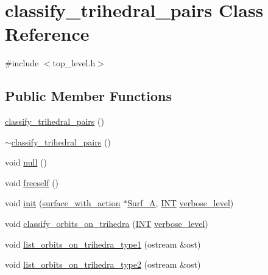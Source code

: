 \hypertarget{classclassify__trihedral__pairs}{}\section{classify\+\_\+trihedral\+\_\+pairs Class Reference}
\label{classclassify__trihedral__pairs}


{\ttfamily \#include $<$top\+\_\+level.\+h$>$}

\subsection*{Public Member Functions}
\begin{DoxyCompactItemize}
\item 
\mbox{\hyperlink{classclassify__trihedral__pairs_a841688b6e1756306ce583b177058911e}{classify\+\_\+trihedral\+\_\+pairs}} ()
\item 
\mbox{\hyperlink{classclassify__trihedral__pairs_a356342a8528414097f3bedbe4bef0212}{$\sim$classify\+\_\+trihedral\+\_\+pairs}} ()
\item 
void \mbox{\hyperlink{classclassify__trihedral__pairs_a53e32015beafedea45f4a695f7f13495}{null}} ()
\item 
void \mbox{\hyperlink{classclassify__trihedral__pairs_a961a7d8228b1ab817d34b3e890186506}{freeself}} ()
\item 
void \mbox{\hyperlink{classclassify__trihedral__pairs_aa71b831292894efc9687cb3e8c8dd73e}{init}} (\mbox{\hyperlink{classsurface__with__action}{surface\+\_\+with\+\_\+action}} $\ast$\mbox{\hyperlink{classclassify__trihedral__pairs_a87a7ed755070199fdf9fad47ae98dcbe}{Surf\+\_\+A}}, \mbox{\hyperlink{galois_8h_a09fddde158a3a20bd2dcadb609de11dc}{I\+NT}} \mbox{\hyperlink{simeon_8_c_a818073fbcc2f439e7c56952f67386122}{verbose\+\_\+level}})
\item 
void \mbox{\hyperlink{classclassify__trihedral__pairs_a99625621bfba4bb65b3d60304b306539}{classify\+\_\+orbits\+\_\+on\+\_\+trihedra}} (\mbox{\hyperlink{galois_8h_a09fddde158a3a20bd2dcadb609de11dc}{I\+NT}} \mbox{\hyperlink{simeon_8_c_a818073fbcc2f439e7c56952f67386122}{verbose\+\_\+level}})
\item 
void \mbox{\hyperlink{classclassify__trihedral__pairs_a5289f00a07639129c5264ba88508ca13}{list\+\_\+orbits\+\_\+on\+\_\+trihedra\+\_\+type1}} (ostream \&ost)
\item 
void \mbox{\hyperlink{classclassify__trihedral__pairs_a98826e788eb4eedfc615144211032633}{list\+\_\+orbits\+\_\+on\+\_\+trihedra\+\_\+type2}} (ostream \&ost)

\end{DoxyCompactItemize}
